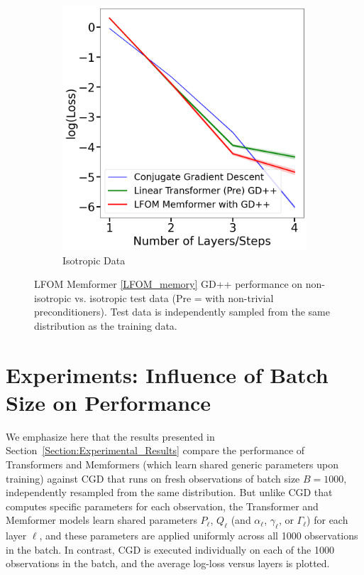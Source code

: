 \documentclass[11pt]{article}
\numberwithin{equation}{section}
\begin{document}
\begin{figure}[!htbp]
\begin{subfigure}[b]{0.45\textwidth}
    \includegraphics[width=\textwidth]{lfom_gdpp_isotropic.png}
    \caption{Isotropic Data}
    \label{fig:lfom_gdpp_isotropic}
  \end{subfigure}
  \caption{LFOM Memformer \eqref{LFOM_memory} GD++ performance on non-isotropic vs. isotropic test data (Pre = with non-trivial preconditioners). Test data is independently sampled from the same distribution as the training data.}
  \label{fig:lfom_gdpp_isotropic_vs_nonisotropic}
\end{figure}

\section{Experiments: Influence of Batch Size on Performance}
\label{Section:Generalized_Performance}
We emphasize here that the results presented in Section~\ref{Section:Experimental_Results} compare the performance of Transformers and Memformers (which learn shared generic parameters upon training) against CGD that runs on fresh observations of batch size \( B = 1000 \), independently resampled from the same distribution. But unlike CGD that computes specific parameters for each observation, the Transformer and Memformer models learn shared parameters \( P_\ell \), \( Q_\ell \) (and \( \alpha_\ell \), \( \gamma_\ell \), or \( \Gamma_\ell \)) for each layer \( \ell \), and these parameters are applied uniformly across all 1000 observations in the batch. In contrast, CGD is executed individually on each of the 1000 observations in the batch, and the average log-loss versus layers is plotted.
\end{document}
